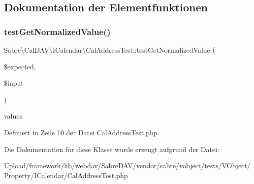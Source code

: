 \subsection{Dokumentation der Elementfunktionen}
\mbox{\label{class_sabre_1_1_v_object_1_1_property_1_1_i_calendar_1_1_cal_address_test_aeabce224617b183f70e7851ad3149c23}} 
\subsubsection{\texorpdfstring{test\+Get\+Normalized\+Value()}{testGetNormalizedValue()}}
{\footnotesize\ttfamily Sabre\textbackslash{}\+Cal\+D\+A\+V\textbackslash{}\+I\+Calendar\textbackslash{}\+Cal\+Address\+Test\+::test\+Get\+Normalized\+Value (\begin{DoxyParamCaption}\item[{}]{\$expected,  }\item[{}]{\$input }\end{DoxyParamCaption})}

values 

Definiert in Zeile 10 der Datei Cal\+Address\+Test.\+php.



Die Dokumentation für diese Klasse wurde erzeugt aufgrund der Datei\+:\begin{DoxyCompactItemize}
\item 
Upload/framework/lib/webdav/\+Sabre\+D\+A\+V/vendor/sabre/vobject/tests/\+V\+Object/\+Property/\+I\+Calendar/Cal\+Address\+Test.\+php\end{DoxyCompactItemize}
